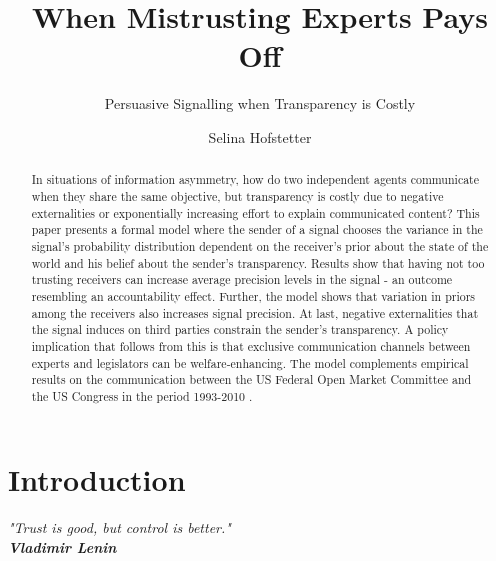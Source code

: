 \documentclass[paper=a4,12pt,DIV=11,twoside=false]{scrartcl}
\begin{document}
\title{When Mistrusting Experts Pays Off}
\subtitle{Persuasive Signalling when Transparency is Costly}
\author{
Selina Hofstetter
}	

\maketitle

\begin{abstract} 
\singlespacing

\noindent In situations of information asymmetry, how do two independent agents communicate when they share the same objective, but transparency is costly due to negative externalities or exponentially increasing effort to explain communicated content? This paper presents a formal model where the sender of a signal chooses the variance in the signal's probability distribution dependent on the receiver's prior about the state of the world and his belief about the sender's transparency. Results show that having not too trusting receivers can increase average precision levels in the signal - an outcome resembling an accountability effect. Further, the model shows that variation in priors among the receivers also increases signal precision. At last, negative externalities that the signal induces on third parties constrain the sender's transparency. A policy implication that follows from this is that exclusive communication channels between experts and legislators can be welfare-enhancing. The model complements empirical results on the communication between the US Federal Open Market Committee and the US Congress in the period 1993-2010 \citep{GL2017}.
\end{abstract}

\newpage
\tableofcontents
\clearpage
\listoffigures

\newpage

\onehalfspacing



\section{Introduction}

\begin{displayquote}
\begin{flushright}
\textit{"Trust is good, but control is better."}\\
\textit{\textbf{Vladimir Lenin}}
\end{flushright}
\end{displayquote}
\end{document}
